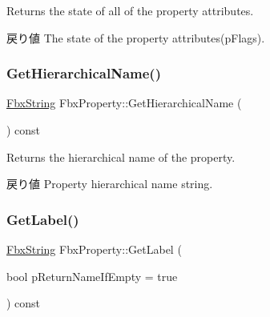 Returns the state of all of the property attributes. \begin{DoxyReturn}{戻り値}
The state of the property attributes(p\+Flags). 
\end{DoxyReturn}
\mbox{\label{class_fbx_property_a6045fdbb1bbe5a84f44c7f447d2fa52c}} 
\subsubsection{\texorpdfstring{Get\+Hierarchical\+Name()}{GetHierarchicalName()}}
{\footnotesize\ttfamily \hyperlink{class_fbx_string}{Fbx\+String} Fbx\+Property\+::\+Get\+Hierarchical\+Name (\begin{DoxyParamCaption}{ }\end{DoxyParamCaption}) const}

Returns the hierarchical name of the property. \begin{DoxyReturn}{戻り値}
Property hierarchical name string. 
\end{DoxyReturn}
\mbox{\label{class_fbx_property_a6efe7b201b09f1694daa39d32ea2d7e1}} 
\subsubsection{\texorpdfstring{Get\+Label()}{GetLabel()}}
{\footnotesize\ttfamily \hyperlink{class_fbx_string}{Fbx\+String} Fbx\+Property\+::\+Get\+Label (\begin{DoxyParamCaption}\item[{bool}]{p\+Return\+Name\+If\+Empty = {\ttfamily true} }\end{DoxyParamCaption}) const}

